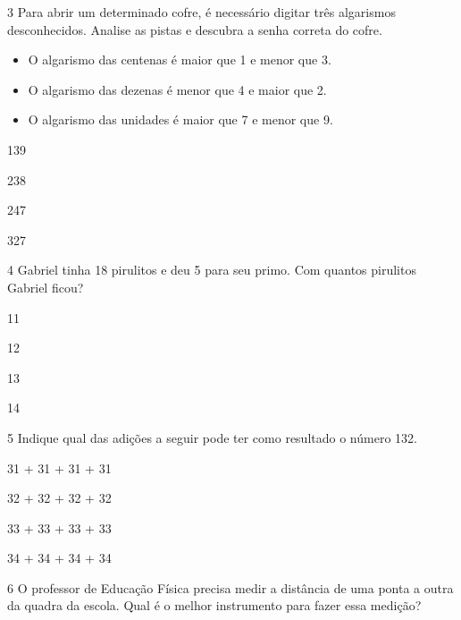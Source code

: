\num{3} Para abrir um determinado cofre, é necessário digitar três algarismos
desconhecidos. Analise as pistas e descubra a senha correta do cofre.

\begin{itemize}
\item
  O algarismo das centenas é maior que 1 e menor que 3.
\item
  O algarismo das dezenas é menor que 4 e maior que 2.
\item
  O algarismo das unidades é maior que 7 e menor que 9.
\end{itemize}


\begin{escolha}
\item 139

\item 238

\item 247

\item 327
\end{escolha}

\num{4} Gabriel tinha 18 pirulitos e deu 5 para seu primo. Com quantos
pirulitos Gabriel ficou?

\begin{escolha}
\item 11

\item 12

\item 13

\item 14
\end{escolha}

\num{5} Indique qual das adições a seguir pode ter como resultado o número 132.

\begin{escolha}
\item 31 + 31 + 31 + 31

\item 32 + 32 + 32 + 32

\item 33 + 33 + 33 + 33

\item 34 + 34 + 34 + 34
\end{escolha}

\pagebreak
\num{6} O professor de Educação Física precisa medir a distância de uma ponta a
outra da quadra da escola. Qual é o melhor instrumento para fazer essa
medição?

